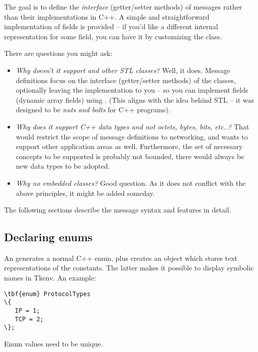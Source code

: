 The goal is to define the \textit{interface} (getter/setter methods) of messages
rather than their implementations in C++. A simple and straightforward
implementation of fields is provided -- if you'd like a different internal
representation for some field, you can have it by customizing the class.

There are questions you might ask:

\begin{itemize}
  \item{\textit{Why doesn't it support  and other STL classes?}
     Well, it does. Message definitions focus on the interface
     (getter/setter methods) of the classes, optionally leaving the implementation
     to you -- so you can implement fields (dynamic array fields)
     using .
     (This aligns with the idea behind STL -- it was designed to be
     \textit{nuts and bolts} for C++ programs).}
  \item{\textit{Why does it support C++ data types and not octets,
     bytes, bits, etc..?}
     That would restrict the scope of message definitions to networking,
     and {\opp} wants to support other application areas as well.
     Furthermore, the set of necessary concepts to be supported is
     probably not bounded, there would always be new data types to
     be adopted.}
  \item{\textit{Why no embedded classes?} Good question. As it does not
     conflict with the above principles, it might be added someday.}
\end{itemize}



The following sections describe the message syntax and features in detail.


\subsection{Declaring enums}

An  generates a normal C++ enum, plus creates an object
which stores text representations of the constants. The latter makes it possible
to display symbolic names in Tkenv.
An example:

\begin{Verbatim}[commandchars=\\\{\}]
\tbf{enum} ProtocolTypes
\{
   IP = 1;
   TCP = 2;
\};
\end{Verbatim}

Enum values need to be unique.


